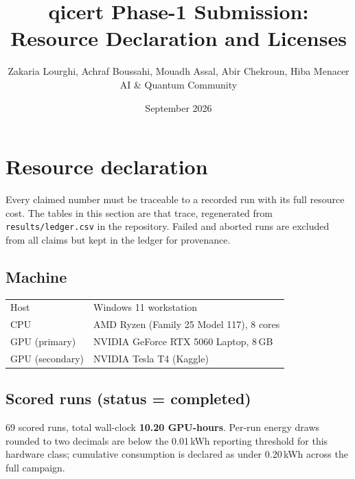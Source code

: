 \documentclass[10pt]{article}
\title{qicert Phase-1 Submission: Resource Declaration and Licenses}
\author{Zakaria Lourghi, Achraf Boussahi, Mouadh Assal, Abir Chekroun, Hiba Menacer\\
AI \& Quantum Community}
\date{September 2026}
\begin{document}
\maketitle

\section{Resource declaration}

Every claimed number must be traceable to a recorded run with its full
resource cost. The tables in this section are that trace, regenerated from
\texttt{results/ledger.csv} in the repository. Failed and aborted runs are
excluded from all claims but kept in the ledger for provenance.

\subsection{Machine}

\begin{tabular}{@{}ll@{}}
\toprule
Host & Windows 11 workstation \\
CPU & AMD Ryzen (Family 25 Model 117), 8 cores \\
GPU (primary) & NVIDIA GeForce RTX 5060 Laptop, 8\,GB \\
GPU (secondary) & NVIDIA Tesla T4 (Kaggle) \\
\bottomrule
\end{tabular}

\subsection{Scored runs (status = completed)}

69 scored runs, total wall-clock \textbf{10.20 GPU-hours}. Per-run energy
draws rounded to two decimals are below the 0.01\,kWh reporting threshold
for this hardware class; cumulative consumption is declared as under
0.20\,kWh across the full campaign.
\end{document}
